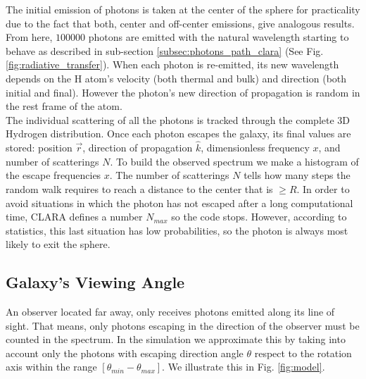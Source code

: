 \documentclass[twocolappendix]{latex/emulateapj}
\begin{document}
The initial emission of photons is taken at the center of the sphere for practicality due to the fact that both, center and off-center emissions, give analogous results. From here, $100000$ photons are emitted with the natural \lya wavelength starting to behave as described in sub-section \ref{subsec:photons_path_clara} (See Fig. \ref{fig:radiative_transfer}). When each photon is re-emitted, its new wavelength depends on the H atom's velocity (both thermal and bulk) and direction (both initial and final). However the photon's new direction of propagation is random in the rest frame of the atom. \\ 

The individual scattering of all the photons is tracked through the complete 3D Hydrogen distribution. Once each photon escapes the galaxy, its final values are stored: position $\vec{r}$, direction of propagation $\hat{k}$, dimensionless frequency $x$, and number of scatterings $N$. To build the observed spectrum we make a histogram of the escape frequencies $x$. The number of scatterings $N$ tells how many steps the random walk requires to reach a distance to the center that is $\geq R$. In order to avoid situations in which the photon has not escaped after a long computational time, CLARA defines a number $N_{max}$ so the code stops. However, according to statistics, this last situation has low probabilities, so the photon is always most likely to exit the sphere. \\


\subsection{Galaxy's Viewing Angle}
An observer located far away, only receives photons emitted along its line of sight. That means, only photons escaping in the direction of the observer must be counted in the spectrum. In the simulation we approximate this by taking into account only the photons with escaping direction angle $\theta$ respect to the rotation axis within the range $[\theta_{min}-\theta_{max}]$. We illustrate this in Fig. \ref{fig:model}. \\
\end{document}
